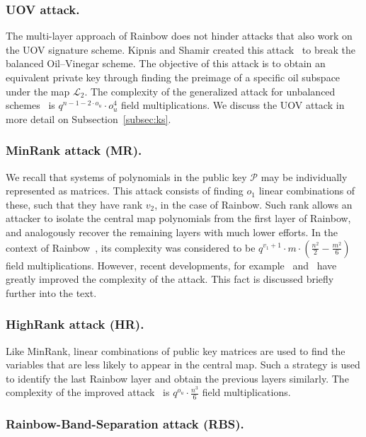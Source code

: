 \documentclass[12pt, a4paper, oneside]{memoir}
\theoremstyle{definition}
\begin{document}
\subsubsection{UOV attack.}

The multi-layer approach of Rainbow does not hinder attacks that also work on the UOV signature scheme. Kipnis and Shamir created this attack~\cite{Kipnis:199808} to break the balanced Oil--Vinegar scheme. The objective of this attack is to obtain an equivalent private key through finding the preimage of a specific oil subspace under the map $\mathcal{L}_{2}$. The complexity of the generalized attack for unbalanced schemes~\cite{Kipnis:199904} is $q^{n - 1 - 2 \cdot o_{u}} \cdot o_{u}^{4}$ field multiplications. We discuss the UOV attack in more detail on Subsection~\ref{subsec:ks}.

\subsubsection{MinRank attack (MR).}

We recall that systems of polynomials in the public key $\mathcal{P}$ may be individually represented as matrices. This attack consists of finding $o_{1}$ linear combinations of these, such that they have rank $v_{2}$, in the case of Rainbow. Such rank allows an attacker to isolate the central map polynomials from the first layer of Rainbow, and analogously recover the remaining layers with much lower efforts. In the context of Rainbow~\cite{Billet:200609,Faugere:200808}, its complexity was considered to be $q^{v_{1} + 1} \cdot m \cdot (\frac{n^{2}}{2} - \frac{m^{2}}{6})$ field multiplications. However, recent developments, for example~\cite[Tab.~3]{Bardet:202006} and~\cite{Nakamura:202007} have greatly improved the complexity of the attack. This fact is discussed briefly further into the text.

\subsubsection{HighRank attack (HR).}

Like MinRank, linear combinations of public key matrices are used to find the variables that are less likely to appear in the central map. Such a strategy is used to identify the last Rainbow layer and obtain the previous layers similarly. The complexity of the improved attack~\cite{Ding:200806} is $q^{o_{u}} \cdot \frac{n^{3}}{6}$ field multiplications.

\subsubsection{Rainbow-Band-Separation attack (RBS).}
\end{document}
